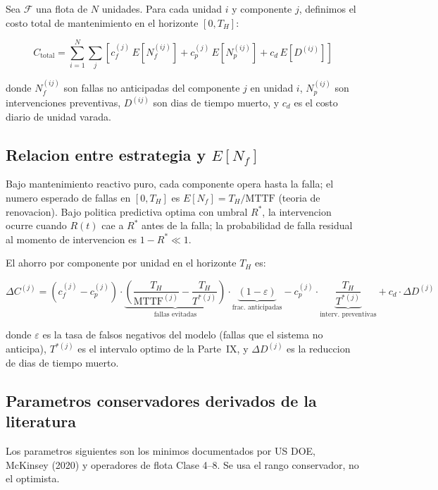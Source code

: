 \documentclass[10.5pt,a4paper]{article}
\begin{document}
Sea $\mathcal{F}$ una flota de $N$ unidades. Para cada unidad $i$ y componente
$j$, definimos el costo total de mantenimiento en el horizonte $[0,T_H]$:

$$C_{\mathrm{total}} = \sum_{i=1}^{N}\sum_{j} \left[
  c_f^{(j)}\,E[N_f^{(ij)}] + c_p^{(j)}\,E[N_p^{(ij)}] + c_d\,E[D^{(ij)}]
\right]$$

donde $N_f^{(ij)}$ son fallas no anticipadas del componente $j$ en unidad $i$,
$N_p^{(ij)}$ son intervenciones preventivas, $D^{(ij)}$ son dias de tiempo muerto,
y $c_d$ es el costo diario de unidad varada.

\subsection{Relacion entre estrategia y $E[N_f]$}

Bajo mantenimiento reactivo puro, cada componente opera hasta la falla; el
numero esperado de fallas en $[0,T_H]$ es $E[N_f] = T_H / \mathrm{MTTF}$ (teoria
de renovacion). Bajo politica predictiva optima con umbral $R^*$, la intervencion
ocurre cuando $R(t)$ cae a $R^*$ antes de la falla; la probabilidad de falla
residual al momento de intervencion es $1-R^* \ll 1$.

El ahorro por componente por unidad en el horizonte $T_H$ es:

\begin{mathbox}
$$\Delta C^{(j)} = (c_f^{(j)} - c_p^{(j)})\cdot
  \underbrace{\left(\frac{T_H}{\mathrm{MTTF}^{(j)}} - \frac{T_H}{T^{*(j)}}\right)}
  _{\text{fallas evitadas}} \cdot \underbrace{(1 - \varepsilon)}_{\text{frac. anticipadas}}
  - c_p^{(j)}\cdot\underbrace{\frac{T_H}{T^{*(j)}}}_{\text{interv. preventivas}}
  + c_d \cdot \Delta D^{(j)}$$

donde $\varepsilon$ es la tasa de falsos negativos del modelo (fallas que el
sistema no anticipa), $T^{*(j)}$ es el intervalo optimo de la Parte~IX, y
$\Delta D^{(j)}$ es la reduccion de dias de tiempo muerto.
\end{mathbox}

\subsection{Parametros conservadores derivados de la literatura}

Los parametros siguientes son los minimos documentados por US DOE, McKinsey (2020)
y operadores de flota Clase 4--8. Se usa el rango conservador, no el optimista.
\end{document}
